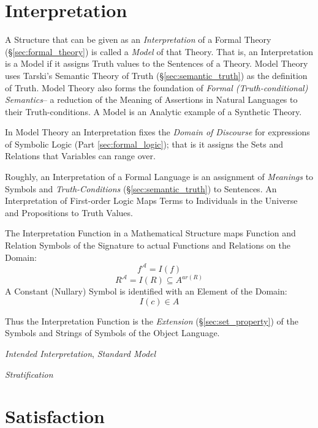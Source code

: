 \section{Interpretation}\label{sec:interpretation}

A Structure that can be given as an \emph{Interpretation} of a Formal
Theory (\S\ref{sec:formal_theory}) is called a \emph{Model} of that
Theory. That is, an Interpretation is a Model if it assigns Truth
values to the Sentences of a Theory. Model Theory uses Tarski's
Semantic Theory of Truth (\S\ref{sec:semantic_truth}) as the
definition of Truth. Model Theory also forms the foundation of
\emph{Formal (Truth-conditional) Semantics}-- a reduction of the
Meaning of Assertions in Natural Languages to their Truth-conditions.
A Model is an Analytic example of a Synthetic Theory. \cite{shulman15}

In Model Theory an Interpretation fixes the \emph{Domain of Discourse}
for expressions of Symbolic Logic (Part \ref{sec:formal_logic}); that
is it assigns the Sets and Relations that Variables can range over.

Roughly, an Interpretation of a Formal Language is an assignment of
\emph{Meanings} to Symbols and \emph{Truth-Conditions}
(\S\ref{sec:semantic_truth}) to Sentences. An Interpretation of
First-order Logic Maps Terms to Individuals in the Universe and
Propositions to Truth Values.

The Interpretation Function in a Mathematical Structure maps Function
and Relation Symbols of the Signature to actual Functions and
Relations on the Domain:
\[
    f^{\mathcal{A}} = I (f)
\]
\[
    R^{\mathcal{A}} = I (R) \subseteq A^{ar(R)}
\]
A Constant (Nullary) Symbol is identified with an Element of the
Domain:
\[
    I(c) \in A
\]

Thus the Interpretation Function is the \emph{Extension}
(\S\ref{sec:set_property}) of the Symbols and Strings of Symbols of
the Object Language.

\emph{Intended Interpretation}, \emph{Standard Model}

\emph{Stratification}



\section{Satisfaction}\label{sec:satisfaction}

